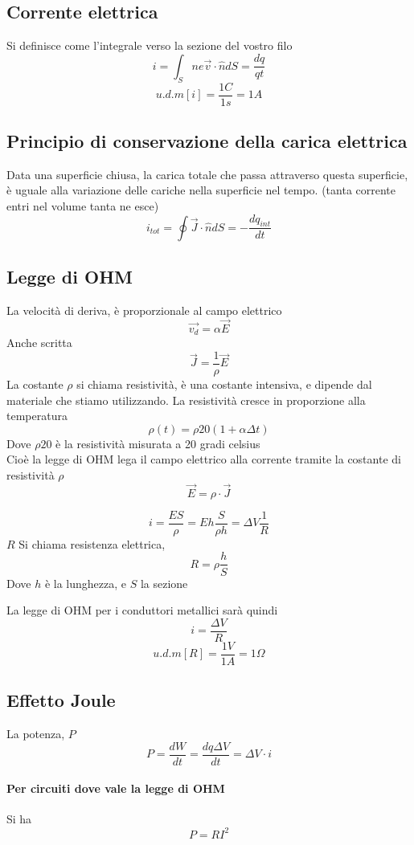\documentclass[a4paper]{report}
\begin{document}
  \subsection{Corrente elettrica}
  Si definisce come l'integrale verso la sezione del vostro filo
  $$ i = \int_S n e \vec{v} \cdot \hat{n} dS = \frac{dq}{qt}$$
  $$ u.d.m[i]=\frac{1C}{1s}= 1A $$

  \subsection{Principio di conservazione della carica elettrica}
  Data una superficie chiusa, la carica totale che passa attraverso questa superficie, è uguale alla variazione delle cariche nella superficie nel tempo. (tanta corrente entri nel volume tanta ne esce)
  $$ i_{tot} = \oint \vec{J} \cdot \hat{n} dS = -\frac{dq_{int}}{dt} $$

  \subsection{Legge di OHM}
  La velocità di deriva, è proporzionale al campo elettrico
  $$ \vec{v_d} = \alpha \vec{E} $$
  Anche scritta
  $$ \vec{J} = \frac{1}{\rho} \vec{E} $$
  La costante $\rho$ si chiama resistività, è una costante intensiva, e dipende dal materiale che stiamo utilizzando.
  La resistività cresce in proporzione alla temperatura
  $$ \rho(t) = \rho{20}(1 + \alpha \Delta t) $$
  Dove $\rho{20}$ è la resistività misurata a 20 gradi celsius\\
  Cioè la legge di OHM lega il campo elettrico alla corrente tramite la costante di resistività $\rho$
  $$ \vec{E} = \rho \cdot \vec{J} $$


  $$ i = \frac{ES}{\rho} = Eh \frac{S}{\rho h} = \Delta V \frac{1}{R} $$
  $R$ Si chiama resistenza elettrica,
  $$ R = \rho \frac{h}{S} $$
  Dove $h$ è la lunghezza, e $S$ la sezione

  La legge di OHM per i conduttori metallici sarà quindi
  $$ i = \frac{\Delta V}{R} $$
  $$ u.d.m[R] = \frac{1V}{1A} = 1 \Omega $$

  \subsection{Effetto Joule}
  La potenza, $P$
  $$ P=\frac{dW}{dt} = \frac{dq\Delta V}{dt} = \Delta V \cdot i$$

  \paragraph{Per circuiti dove vale la legge di OHM}
  Si ha
  $$ P = R I^2 $$
\end{document}

